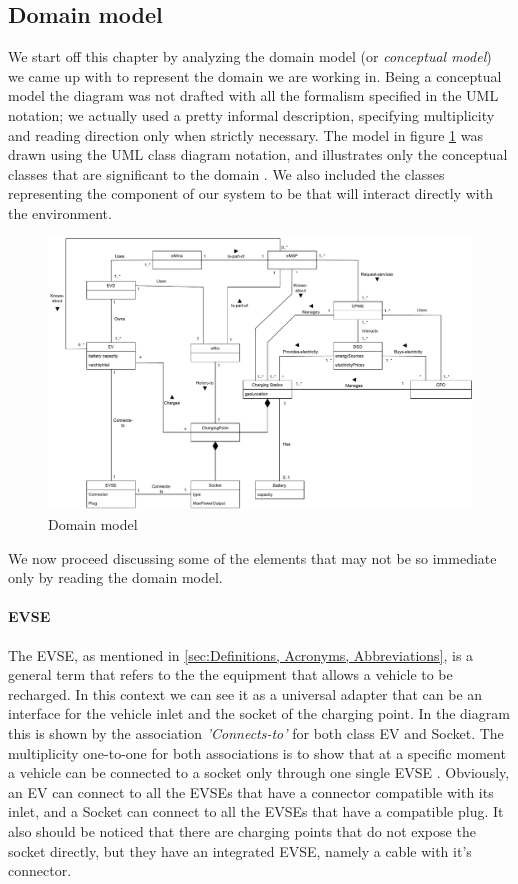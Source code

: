 \subsection{Domain model}
We start off this chapter by analyzing the domain model (or \textit{conceptual model}) we came up with to represent the domain we are working in. Being a conceptual model the diagram was not drafted with all the formalism specified in the UML notation; we actually used a pretty informal description, specifying multiplicity and reading direction only when strictly necessary. The model in figure \ref{domain_model} was drawn using the UML class diagram notation, and illustrates only the conceptual classes that are significant to the domain \cite{larmanUML}. We also included the classes representing the component of our system to be that will interact directly with the environment.\\
\begin{figure}[H]
    \centering
    \includegraphics[width=1\textwidth]{Images/cp2/domain_model_v1}
    \caption{Domain model}
    \label{domain_model}
\end{figure}

We now proceed discussing some of the elements that may not be so immediate only by reading the domain model.


\paragraph{EVSE}
The EVSE, as mentioned in \ref{sec:Definitions, Acronyms, Abbreviations}, is a general term that refers to the the equipment that allows a vehicle to be recharged. In this context we can see it as a universal adapter that can be an interface for the vehicle inlet and the socket of the charging point. In the diagram this is shown by the association \textit{'Connects-to'} for both class EV and Socket. The multiplicity one-to-one for both associations is to show that at a specific moment a vehicle can be connected to a socket only through one single EVSE \cite{larmanUML}. Obviously, an EV can connect to all the EVSEs that have a connector compatible with its inlet, and a Socket can connect to all the EVSEs that have a compatible plug. It also should be noticed that there are charging points that do not expose the socket directly, but they have an integrated EVSE, namely a cable with it's connector.

